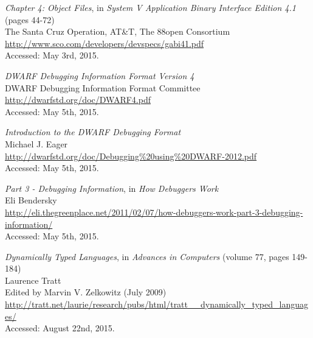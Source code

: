 
\begin{thebibliography}{99}

		\emph{Chapter 4: Object Files}, in
		\emph{System V Application Binary Interface Edition 4.1} (pages 44-72) \\
		The Santa Cruz Operation, AT\&T, The 88open Consortium \\
		\url{http://www.sco.com/developers/devspecs/gabi41.pdf} \\
		Accessed: May 3rd, 2015.


		\emph{DWARF Debugging Information Format Version 4} \\
		DWARF Debugging Information Format Committee \\
		\url{http://dwarfstd.org/doc/DWARF4.pdf} \\
		Accessed: May 5th, 2015.

		\emph{Introduction to the DWARF Debugging Format} \\
		Michael J. Eager \\
		\url{http://dwarfstd.org/doc/Debugging\%20using\%20DWARF-2012.pdf} \\
		Accessed: May 5th, 2015.

		\emph{Part 3 -  Debugging Information}, in \emph{How Debuggers Work} \\
		Eli Bendersky \\
		\url{http://eli.thegreenplace.net/2011/02/07/how-debuggers-work-part-3-debugging-information/} \\
		Accessed: May 5th, 2015.

		\emph{Dynamically Typed Languages},
		in \emph{Advances in Computers} (volume 77, pages 149-184) \\
		Laurence Tratt \\
		Edited by Marvin V. Zelkowitz (July 2009) \\
		\url{http://tratt.net/laurie/research/pubs/html/tratt__dynamically_typed_languages/} \\
		Accessed: August 22nd, 2015.


\end{thebibliography}
